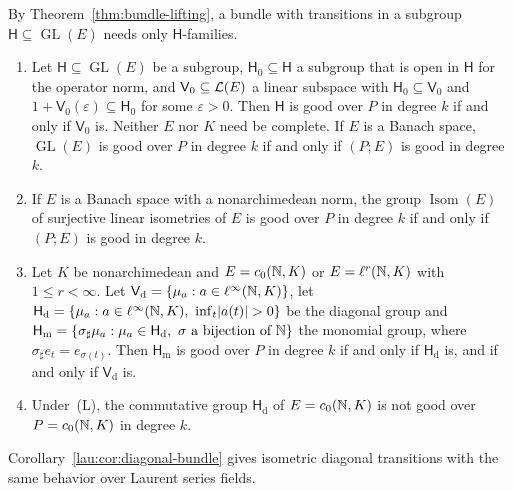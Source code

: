 By Theorem~\ref{thm:bundle-lifting}, a bundle with transitions in a subgroup $\mathsf H\subseteq\operatorname{GL}(E)$ needs
only $\mathsf H$-families.

\begin{theorem}\label{fam2:thm:groups}
\begin{enumerate}
\item Let $\mathsf H\subseteq\operatorname{GL}(E)$ be a subgroup, $\mathsf H_0\subseteq\mathsf H$ a subgroup that is open in
$\mathsf H$ for the operator norm, and $\mathsf V_0\subseteq\mathcal L(E)$ a linear subspace with $\mathsf H_0\subseteq\mathsf V_0$
and $1+\mathsf V_0(\varepsilon)\subseteq\mathsf H_0$ for some $\varepsilon>0$. Then $\mathsf H$ is good over $P$ in degree
$k$ if and only if $\mathsf V_0$ is. Neither $E$ nor $K$ need be complete. If $E$ is a Banach space, $\operatorname{GL}(E)$ is
good over $P$ in degree $k$ if and only if $(P;E)$ is good in degree $k$.
\item If $E$ is a Banach space with a nonarchimedean norm, the group $\operatorname{Isom}(E)$ of surjective
linear isometries of $E$ is good over $P$ in degree $k$ if and only if $(P;E)$ is good in degree $k$.
\item Let $K$ be nonarchimedean and $E=c_0(\mathbb N,K)$ or $E=\ell^r(\mathbb N,K)$ with $1\le r<\infty$. Let
$\mathsf V_{\mathrm d}=\{\mu_a:a\in\ell^\infty(\mathbb N,K)\}$, let
$\mathsf H_{\mathrm d}=\{\mu_a:a\in\linf(\N,K),\ \inf_t\abs{a(t)}>0\}$ be the diagonal group and
$\mathsf H_{\mathrm m}=\{\sigma_\sharp\mu_a:\mu_a\in\mathsf H_{\mathrm d},\ \sigma\text{ a bijection of }\mathbb N\}$ the monomial
group, where $\sigma_\sharp e_t=e_{\sigma(t)}$. Then $\mathsf H_{\mathrm m}$ is good over $P$ in degree $k$ if and only if
$\mathsf H_{\mathrm d}$ is, and if and only if $\mathsf V_{\mathrm d}$ is.
\item Under~\textup{(L)}, the commutative group $\mathsf H_{\mathrm d}$ of $E=c_0(\mathbb N,K)$ is not good over $P=c_0(\mathbb N,K)$ in
degree $k$.
\end{enumerate}
\end{theorem}

Corollary~\ref{lau:cor:diagonal-bundle} gives isometric diagonal transitions with the same behavior over Laurent series
fields.


